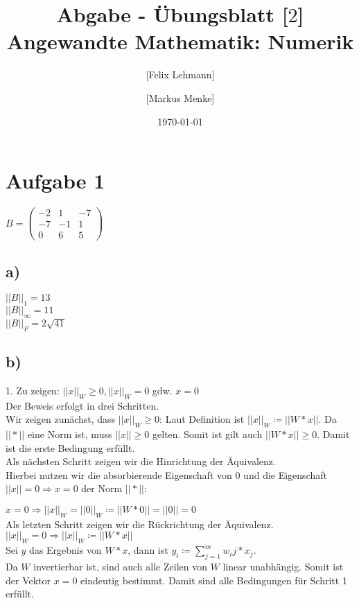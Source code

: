 \documentclass[10pt,a4paper]{article}
\begin{document}
\title{Abgabe - Übungsblatt [$2$]\\
\small{Angewandte Mathematik: Numerik}}
\author{ [Felix Lehmann] \and [Markus Menke]}
\date{\today}
\maketitle

\section*{Aufgabe 1}
$B = \begin{pmatrix}
    -2 &  1 & -7\\
    -7 & -1 &  1\\
     0 &  6 &  5
    \end{pmatrix}$

\subsection*{a)}
$||B||_1 = 13$\\
$||B||_\infty = 11$\\
$||B||_F = 2\sqrt{41}$

\subsection*{b)}
1. Zu zeigen: $||x||_W \geq 0, ||x||_W = 0$ gdw. $ x = 0$\\

Der Beweis erfolgt in drei Schritten.\\
Wir zeigen zunächst, dass $||x||_W \geq 0$:
Laut Definition ist $||x||_W \coloneqq ||W*x||$. Da $||*||$ eine Norm ist, muss $||x|| \geq 0$ gelten. Somit ist gilt auch $||W*x|| \geq 0$. Damit ist die erste Bedingung erfüllt.\\

Als nächsten Schritt zeigen wir die Hinrichtung der Äquivalenz.\\ Hierbei nutzen wir die absorbierende Eigenschaft von 0 und die Eigenschaft $||x|| = 0 \Rightarrow x = 0$ der Norm $||*||$:

$x = 0 \Rightarrow ||x||_W = ||0||_W \coloneqq ||W*0|| = ||0|| = 0$\\

Als letzten Schritt zeigen wir die Rückrichtung der Äquivalenz.\\
$||x||_W = 0 \Rightarrow ||x||_W \coloneqq ||W*x||$\\
Sei $y$ das Ergebnis von $W*x$, dann ist $y_i \coloneqq \sum_{j=1}^m w_ij * x_j$.\\
Da $W$ invertierbar ist, sind auch alle Zeilen von $W$ linear unabhängig. Somit ist der Vektor $x=0$ eindeutig bestimmt. Damit sind alle Bedingungen für Schritt 1 erfüllt.\\
\end{document}

